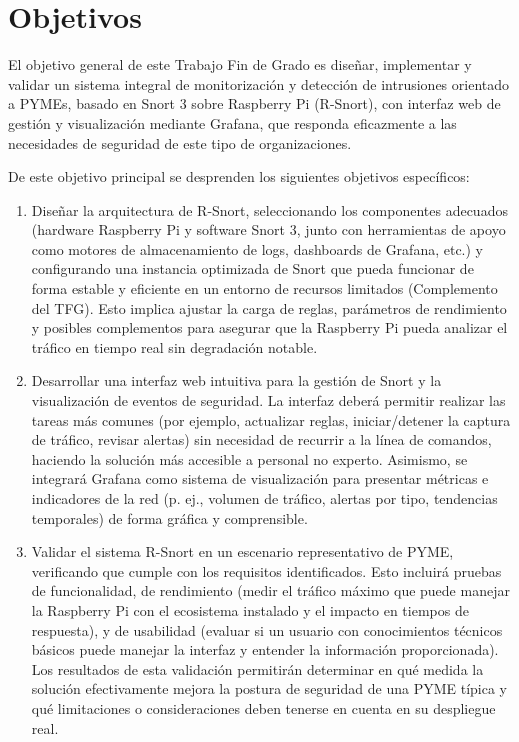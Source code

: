 \documentclass[11pt,a4paper,twoside]{report}
\begin{document}
\section{Objetivos}

El objetivo general de este Trabajo Fin de Grado es diseñar, implementar y validar un sistema integral de monitorización y detección de intrusiones orientado a PYMEs, basado en Snort 3 sobre Raspberry Pi (R-Snort), con interfaz web de gestión y visualización mediante Grafana, que responda eficazmente a las necesidades de seguridad de este tipo de organizaciones.\newline

De este objetivo principal se desprenden los siguientes objetivos específicos:

\begin{enumerate}	
	\item Diseñar la arquitectura de R-Snort, seleccionando los componentes adecuados (hardware Raspberry Pi y software Snort 3, junto con herramientas de apoyo como motores de almacenamiento de logs, dashboards de Grafana, etc.) y configurando una instancia optimizada de Snort que pueda funcionar de forma estable y eficiente en un entorno de recursos limitados (Complemento del TFG). Esto implica ajustar la carga de reglas, parámetros de rendimiento y posibles complementos para asegurar que la Raspberry Pi pueda analizar el tráfico en tiempo real sin degradación notable.
	
	\item Desarrollar una interfaz web intuitiva para la gestión de Snort y la visualización de eventos de seguridad. La interfaz deberá permitir realizar las tareas más comunes (por ejemplo, actualizar reglas, iniciar/detener la captura de tráfico, revisar alertas) sin necesidad de recurrir a la línea de comandos, haciendo la solución más accesible a personal no experto. Asimismo, se integrará Grafana como sistema de visualización para presentar métricas e indicadores de la red (p. ej., volumen de tráfico, alertas por tipo, tendencias temporales) de forma gráfica y comprensible.
	
	\item Validar el sistema R-Snort en un escenario representativo de PYME, verificando que cumple con los requisitos identificados. Esto incluirá pruebas de funcionalidad, de rendimiento (medir el tráfico máximo que puede manejar la Raspberry Pi con el ecosistema instalado y el impacto en tiempos de respuesta), y de usabilidad (evaluar si un usuario con conocimientos técnicos básicos puede manejar la interfaz y entender la información proporcionada). Los resultados de esta validación permitirán determinar en qué medida la solución efectivamente mejora la postura de seguridad de una PYME típica y qué limitaciones o consideraciones deben tenerse en cuenta en su despliegue real.
\end{enumerate}
\end{document}
